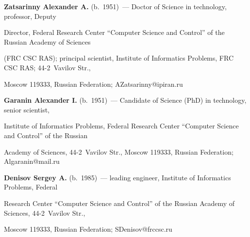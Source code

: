 


\Contr



\noindent

\textbf{Zatsarinny Alexander A.} (b.\ 1951)~--- Doctor of Science in technology, professor, Deputy 

Director, Federal Research Center ``Computer Science and Control'' of the Russian Academy of Sciences 

(FRC CSC RAS); principal scientist, Institute of Informatics Problems, FRC CSC RAS; 44-2~Vavilov Str., 

Moscow 119333, Russian Federation; \mbox{AZatsarinny@ipiran.ru}



\vspace*{3pt}



\noindent

\textbf{Garanin Alexander I.} (b.\ 1951)~--- Candidate of Science (PhD) in technology, senior scientist, 

Institute of Informatics Problems, Federal Research Center ``Computer Science and Control'' of the Russian 

Academy of Sciences, 44-2~Vavilov Str., Moscow 119333, Russian Federation; \mbox{Algaranin@mail.ru} 





\vspace*{3pt}



\noindent

\textbf{Denisov Sergey A.} (b.\ 1985)~--- leading engineer, Institute of Informatics Problems, Federal 

Research Center ``Computer Science and Control'' of the Russian Academy of Sciences, 44-2~Vavilov Str., 

Moscow 119333, Russian Federation; \mbox{SDenisov@frccsc.ru}







\label{end\stat}



\renewcommand{\bibname}{\protect\rm Литература} 

